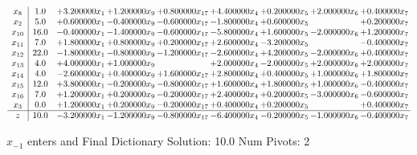 \documentclass[10pt]{article}
\begin{document}
 \[\begin{array}{c| c c@{\hskip 2pt} c@{\hskip 2pt} c@{\hskip 2pt} c@{\hskip 2pt} c@{\hskip 2pt} c@{\hskip 2pt} c@{\hskip 2pt} }
 x_{8}   &  1.0 & + 3.200000 x_{1} & + 1.200000 x_{9} & + 0.800000 x_{17} & + 4.400000 x_{4} & + 0.200000 x_{5} & + 2.000000 x_{6} & + 0.400000 x_{7}\\
 x_{2}   &  5.0 & + 0.600000 x_{1} & -0.400000 x_{9} & -0.600000 x_{17} & -1.800000 x_{4} & + 0.600000 x_{5} &   & + 0.200000 x_{7}\\
 x_{10}   &  16.0 & -0.400000 x_{1} & -1.400000 x_{9} & -0.600000 x_{17} & -5.800000 x_{4} & + 1.600000 x_{5} & -2.000000 x_{6} & + 1.200000 x_{7}\\
 x_{11}   &  7.0 & + 1.800000 x_{1} & + 0.800000 x_{9} & + 0.200000 x_{17} & + 2.600000 x_{4} & -3.200000 x_{5} &   & -0.400000 x_{7}\\
 x_{12}   &  22.0 & -1.800000 x_{1} & -0.800000 x_{9} & -1.200000 x_{17} & -2.600000 x_{4} & + 4.200000 x_{5} & -2.000000 x_{6} & + 0.400000 x_{7}\\
 x_{13}   &  4.0 & + 4.000000 x_{1} & + 1.000000 x_{9} &   & + 2.000000 x_{4} & -2.000000 x_{5} & + 2.000000 x_{6} & + 2.000000 x_{7}\\
 x_{14}   &  4.0 & -2.600000 x_{1} & + 0.400000 x_{9} & + 1.600000 x_{17} & + 2.800000 x_{4} & + 0.400000 x_{5} & + 1.000000 x_{6} & + 1.800000 x_{7}\\
 x_{15}   &  12.0 & + 3.800000 x_{1} & -0.200000 x_{9} & -0.800000 x_{17} & + 1.600000 x_{4} & + 1.800000 x_{5} & + 1.000000 x_{6} & -0.400000 x_{7}\\
 x_{16}   &  7.0 & + 1.200000 x_{1} & + 0.200000 x_{9} & -0.200000 x_{17} & + 2.400000 x_{4} & + 0.200000 x_{5} & -3.000000 x_{6} & -0.600000 x_{7}\\
 x_{3}   &  0.0 & + 1.200000 x_{1} & + 0.200000 x_{9} & -0.200000 x_{17} & + 0.400000 x_{4} & + 0.200000 x_{5} &   & + 0.400000 x_{7}\\
\hline
z    &  10.0 & -3.200000 x_{1} & -1.200000 x_{9} & -0.800000 x_{17} & -6.400000 x_{4} & -0.200000 x_{5} & -1.000000 x_{6} & -0.400000 x_{7}\\
\end{array}\]


 $ x_{-1} $ enters and Final Dictionary
Solution:  10.0
Num Pivots:  2
\end{document}
